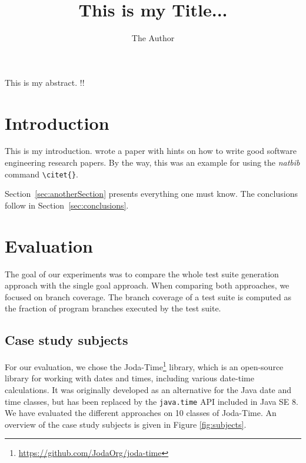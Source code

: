 \documentclass[pdftex,english,oribibl]{llncs}
\title{This is my Title...}
\author{The Author}
\institute{Humboldt University of Berlin\\Department of Computer Science\\12489 Berlin, Germany}
\makeatletter
\gdef\@keywords{}
\renewenvironment{abstract}{%
  \list{}{\advance\topsep by0.35cm\relax\small%
          \leftmargin=1cm%
          \labelwidth=\z@%
          \listparindent=\z@%
          \itemindent\listparindent%
          \rightmargin\leftmargin}%
          \item[\hskip\labelsep\bfseries\abstractname]}{%
  \if!\@keywords!\else{\item[~]\item[\hskip\labelsep\bfseries\keywordname]\@keywords}\fi%
  \endlist}
\makeatother
\begin{document}
\maketitle

\begin{abstract}
  This is my abstract.
\end{abstract}

\section{Introduction}

  This is my introduction. \citet{Shaw2003WritingGoodSoftwareEngineeringResearchPapersMinitutorial} wrote a paper with hints on how to write good software engineering research papers. By the way, this was an example for using the \textit{natbib} command \texttt{\textbackslash{}citet\{\}}.

  Section~\ref{sec:anotherSection} presents everything one must know. The conclusions follow in Section~\ref{sec:conclusions}.



\section{Evaluation}
The goal of our experiments was to compare the whole test suite generation approach with the single goal approach. When comparing both approaches, we focused on branch coverage. The branch coverage of a test suite is computed as the fraction of program branches executed by the test suite. 
\subsection{Case study subjects}
For our evaluation, we chose the Joda-Time\footnote[1]{\url{https://github.com/JodaOrg/joda-time}} library, which is an open-source library for working with dates and times, including various date-time calculations. It was originally developed as an alternative for the Java date and time classes, but has been replaced by the \texttt{java.time} API included in Java SE 8. We have evaluated the different approaches on 10 classes of Joda-Time. An overview of the case study subjects is given in Figure \ref{fig:subjects}.
\end{document}
